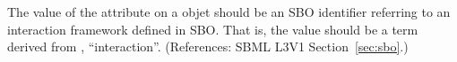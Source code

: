 The value of the  attribute on a \Model objet should be an
SBO identifier referring to an interaction framework defined in SBO.  That
is, the value should be a term derived from \sbointeractionID,
``interaction''.  (References: SBML L3V1 Section~\ref{sec:sbo}.)
